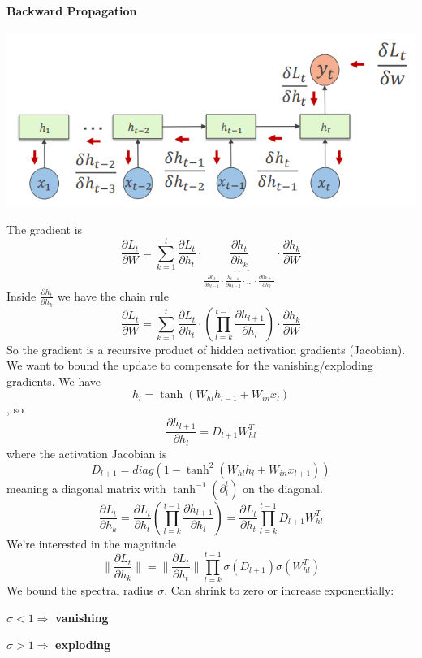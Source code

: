 \documentclass[10pt]{report}
\begin{document}
\paragraph{Backward Propagation}
\begin{center}
	\includegraphics[scale=0.5]{156.png}
\end{center}
The gradient is
$$\frac{\partial L_t}{\partial W} = \sum_{k=1}^t\frac{\partial L_t}{\partial h_t}\cdot\underbrace{\frac{\partial h_t}{\partial h_k}}_{\frac{\partial h_t}{\partial h_{t-1}}\cdot\frac{h_{t-1}}{\partial h_{t-2}}\cdot\ldots\cdot\frac{\partial h_{k+1}}{\partial h_k}}\cdot\frac{\partial h_k}{\partial W}$$
Inside $\frac{\partial h_t}{\partial h_k}$ we have the chain rule
$$\frac{\partial L_t}{\partial W} =  \sum_{k=1}^t\frac{\partial L_t}{\partial h_t}\cdot\left(\prod_{l=k}^{t-1}\frac{\partial h_{l+1}}{\partial h_l}\right)\cdot\frac{\partial h_k}{\partial W}$$
So the gradient is a recursive product of hidden activation gradients (Jacobian). We want to bound the update to compensate for the vanishing/exploding gradients. We have $$h_l = \tanh(W_{hl}h_{l-1}+W_{in}x_l)$$, so $$\frac{\partial h_{l+1}}{\partial h_l} = D_{l+1}W_{hl}^T$$ where the activation Jacobian is $$D_{l+1} = diag(1-\tanh^2(W_{hl}h_l + W_{in}x_{l+1}))$$
meaning a diagonal matrix with $\tanh^{-1}(\partial_i^t)$ on the diagonal.
$$\frac{\partial L_t}{\partial h_k} = \frac{\partial L_t}{\partial h_t}\left(\prod_{l=k}^{t-1}\frac{\partial h_{l+1}}{\partial h_l}\right) = \frac{\partial L_t}{\partial h_t}\prod_{l=k}^{t-1}D_{l+1}W_{hl}^T $$
We're interested in the magnitude 
$$\|\frac{\partial L_t}{\partial h_k}\| = \|\frac{\partial L_t}{\partial h_t}\|\prod_{l=k}^{t-1}\sigma(D_{l+1})\sigma(W_{hl}^T)$$
We bound the spectral radius $\sigma$. Can shrink to zero or increase exponentially:\begin{list}{}{}
	\item $\sigma < 1 \Rightarrow$ \textbf{vanishing}
	\item $\sigma > 1 \Rightarrow$ \textbf{exploding}
\end{list}
\end{document}
